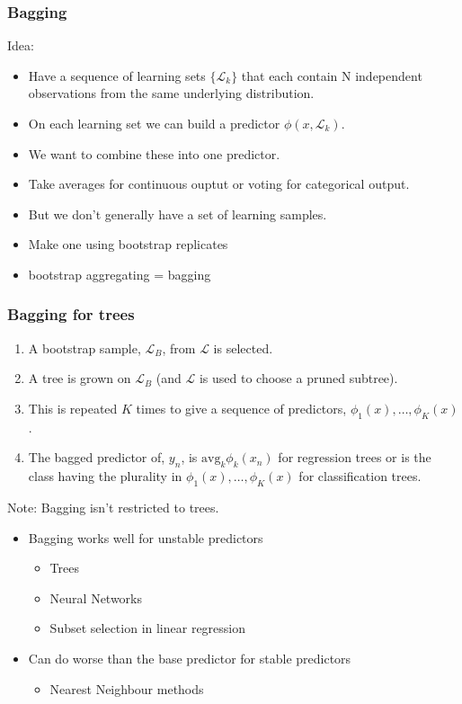 \documentclass{beamer}
\begin{document}
\begin{frame}
	\frametitle{Bagging}
	Idea:
	\begin{itemize}
		\item Have a sequence of learning sets $\{\mathcal{L}_k\}$ that each contain N independent observations from the same underlying distribution.
		\item On each learning set we can build a predictor $\phi(x, \mathcal{L}_k)$.
		\item We want to combine these into one predictor.
		\item Take averages for continuous ouptut or voting for categorical output.
		\item But we don't generally have a set of learning samples.
		\item Make one using bootstrap replicates
		\item bootstrap aggregating = bagging
	\end{itemize}
\end{frame}

\begin{frame}
	\frametitle{Bagging for trees}
	\begin{enumerate}
		\item A bootstrap sample, $\mathcal{L}_B$, from $\mathcal{L}$ is selected.
		\item A tree is grown on $\mathcal{L}_B$ (and $\mathcal{L}$ is used to choose a pruned subtree).
		\item This is repeated $K$ times to give a sequence of predictors, $\phi_1(x), \ldots, \phi_K(x)$.
		\item The bagged predictor of, $y_n$, is  $\text{avg}_k \phi_k(x_n)$ for regression trees or is the class having the plurality  in  $\phi_1(x), \ldots, \phi_K(x)$ for classification trees.
	\end{enumerate}
	Note: Bagging isn't restricted to trees.
\end{frame}

\begin{frame}
\begin{itemize}
	\item Bagging works well for unstable predictors
		\begin{itemize}
			\item Trees
			\item Neural Networks
			\item Subset selection in linear regression
		\end{itemize}
	\item Can do worse than the base predictor for stable predictors
	\begin{itemize}
		\item 		Nearest Neighbour methods
	\end{itemize}
\end{itemize}
\end{frame}
\end{document}
